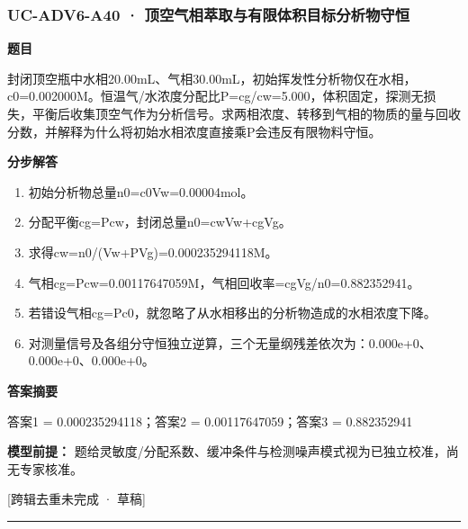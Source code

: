 \documentclass[UTF8,11pt,a4paper]{ctexart}
\begin{document}
\subsubsection*{UC-ADV6-A40 · 顶空气相萃取与有限体积目标分析物守恒}
\noindent\textbf{题目}\par
封闭顶空瓶中水相20.00mL、气相30.00mL，初始挥发性分析物仅在水相，c0=0.002000M。恒温气/水浓度分配比P=cg/cw=5.000，体积固定，探测无损失，平衡后收集顶空气作为分析信号。求两相浓度、转移到气相的物质的量与回收分数，并解释为什么将初始水相浓度直接乘P会违反有限物料守恒。\par
\medskip\noindent\textbf{分步解答}
\begin{enumerate}
\item 初始分析物总量n0=c0Vw=0.00004mol。
\item 分配平衡cg=Pcw，封闭总量n0=cwVw+cgVg。
\item 求得cw=n0/(Vw+PVg)=0.000235294118M。
\item 气相cg=Pcw=0.00117647059M，气相回收率=cgVg/n0=0.882352941。
\item 若错设气相cg=Pc0，就忽略了从水相移出的分析物造成的水相浓度下降。
\item 对测量信号及各组分守恒独立逆算，三个无量纲残差依次为：0.000e+0、0.000e+0、0.000e+0。
\end{enumerate}
\noindent\textbf{答案摘要}\par
答案1 = 0.000235294118；答案2 = 0.00117647059；答案3 = 0.882352941\par
\noindent\textbf{模型前提：}
题给灵敏度/分配系数、缓冲条件与检测噪声模式视为已独立校准，尚无专家核准。\par
\noindent\textcolor{red!65!black}{[跨辑去重未完成 · 草稿]} \par
\medskip\hrule\medskip
{}
\end{document}
